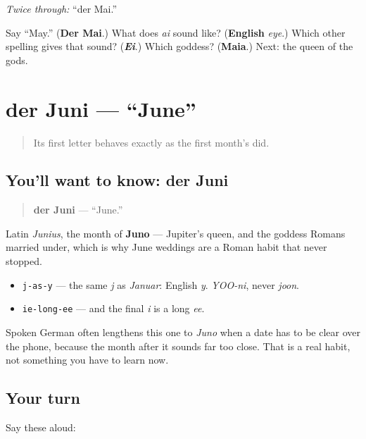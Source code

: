 \emph{Twice through:} \textquotedblleft{}der Mai.\textquotedblright{}

\begin{tcolorbox}[breakable,colback=teal!4,colframe=teal!35!black,title={Before you move on}]
Say \textquotedblleft{}May.\textquotedblright{} (\textbf{Der Mai}.) What does \emph{ai} sound like? (\textbf{English} \emph{eye}.) Which other spelling gives that sound? (\emph{\textbf{Ei}}.) Which goddess? (\textbf{Maia}.) Next: the queen of the gods.
\end{tcolorbox}
\section[der Juni]{der Juni — \textquotedblleft{}June\textquotedblright{}}

\label{lesson:GE-C09-juni}



\begin{quote}
Its first letter behaves exactly as the first month's did.
\end{quote}

\subsection*{You'll want to know: der Juni}
\begin{quote}
\textbf{der Juni} — \textquotedblleft{}June.\textquotedblright{}
\end{quote}

Latin \emph{Junius}, the month of \textbf{Juno} — Jupiter's queen, and the goddess Romans married under, which is why June weddings are a Roman habit that never stopped.

\begin{sounds}
\begin{itemize}
\raggedright
  \item \texttt{j-as-y} — the same \emph{j} as \emph{Januar}: English \emph{y}. \emph{YOO-ni}, never \emph{joon}.
  \item \texttt{ie-long-ee} — and the final \emph{i} is a long \emph{ee}.
\end{itemize}

Spoken German often lengthens this one to \emph{Juno} when a date has to be clear over the phone, because the month after it sounds far too close. That is a real habit, not something you have to learn now.
\end{sounds}

\subsection*{Your turn}
Say these aloud:

